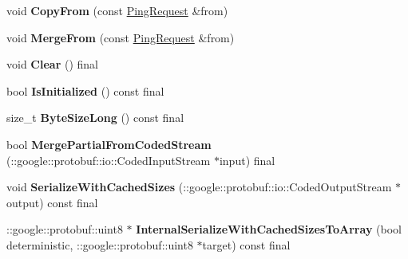 \begin{DoxyCompactItemize}
\mbox{\label{classcoappbrpc_1_1api_1_1PingRequest_a0df9f09a84a861973e28b20f597182c4}} 
void {\bfseries Copy\+From} (const \hyperlink{classcoappbrpc_1_1api_1_1PingRequest}{Ping\+Request} \&from)
\item 
\mbox{\label{classcoappbrpc_1_1api_1_1PingRequest_a30f9f26f9b3f4861d257e3368d6cbc07}} 
void {\bfseries Merge\+From} (const \hyperlink{classcoappbrpc_1_1api_1_1PingRequest}{Ping\+Request} \&from)
\item 
\mbox{\label{classcoappbrpc_1_1api_1_1PingRequest_a1506ad5ccfff288c94e86e0b013d8b31}} 
void {\bfseries Clear} () final
\item 
\mbox{\label{classcoappbrpc_1_1api_1_1PingRequest_a5a9ef42d4edb51d822cbdce0514f9627}} 
bool {\bfseries Is\+Initialized} () const final
\item 
\mbox{\label{classcoappbrpc_1_1api_1_1PingRequest_a1292ce7e446a67b88dc10f9a8a4b7098}} 
size\+\_\+t {\bfseries Byte\+Size\+Long} () const final
\item 
\mbox{\label{classcoappbrpc_1_1api_1_1PingRequest_a405b8fe1265cc8ef1741166b36302159}} 
bool {\bfseries Merge\+Partial\+From\+Coded\+Stream} (\+::google\+::protobuf\+::io\+::\+Coded\+Input\+Stream $\ast$input) final
\item 
\mbox{\label{classcoappbrpc_1_1api_1_1PingRequest_a4941109556371f45e54ea90a59d10aa9}} 
void {\bfseries Serialize\+With\+Cached\+Sizes} (\+::google\+::protobuf\+::io\+::\+Coded\+Output\+Stream $\ast$output) const final
\item 
\mbox{\label{classcoappbrpc_1_1api_1_1PingRequest_ab903005ed12944d7f49e35eca02020c4}} 
\+::google\+::protobuf\+::uint8 $\ast$ {\bfseries Internal\+Serialize\+With\+Cached\+Sizes\+To\+Array} (bool deterministic, \+::google\+::protobuf\+::uint8 $\ast$target) const final
\item 
\mbox{\label{classcoappbrpc_1_1api_1_1PingRequest_af04b35060676fe0b80e7696b807cee38}} 

\end{DoxyCompactItemize}

